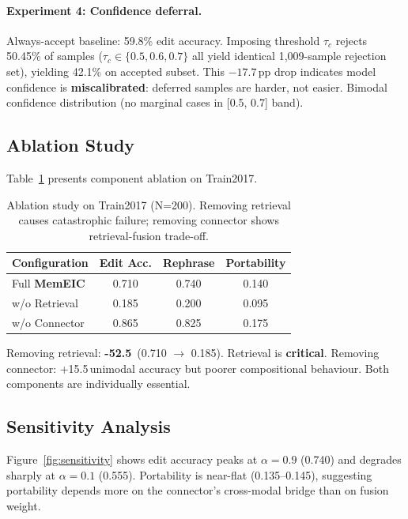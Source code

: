 \documentclass[11pt]{article}
\newcommand{\memeic}{\textbf{MemEIC}}
\newcommand{\pp}{\,\text{pp}}
\newcommand{\degrade}[1]{\textcolor{memred}{\textbf{#1}}}
\begin{document}
\paragraph{Experiment 4: Confidence deferral.}
Always-accept baseline: 59.8\% edit accuracy. Imposing threshold $\tau_c$
rejects 50.45\% of samples ($\tau_c \in \{0.5, 0.6, 0.7\}$ all yield identical
1{,}009-sample rejection set), yielding 42.1\% on accepted subset. This
$-17.7\pp$ drop indicates model confidence is \textbf{miscalibrated}: deferred
samples are harder, not easier. Bimodal confidence distribution (no marginal
cases in [0.5, 0.7] band).

\subsection{Ablation Study}
\label{sec:ablation}

Table~\ref{tab:ablation} presents component ablation on Train2017.

\begin{table}[t]
\centering
\caption{Ablation study on Train2017 (N=200). Removing retrieval causes
catastrophic failure; removing connector shows retrieval-fusion trade-off.}
\label{tab:ablation}
\small
\begin{tabular}{@{}lccc@{}}
\toprule
\textbf{Configuration} & \textbf{Edit Acc.} & \textbf{Rephrase} & \textbf{Portability} \\
\midrule
Full \memeic{}             & 0.710 & 0.740 & 0.140 \\
w/o Retrieval              & 0.185 & 0.200 & 0.095 \\
w/o Connector              & 0.865 & 0.825 & 0.175 \\
\bottomrule
\end{tabular}
\end{table}

Removing retrieval: \degrade{-52.5\pp} (0.710 $\to$ 0.185). Retrieval is
\textbf{critical}. Removing connector: +15.5\pp unimodal accuracy but poorer
compositional behaviour. Both components are individually essential.

\subsection{Sensitivity Analysis}
\label{sec:sensitivity}

Figure~\ref{fig:sensitivity} shows edit accuracy peaks at $\alpha=0.9$
(0.740) and degrades sharply at $\alpha=0.1$ (0.555). Portability is
near-flat (0.135--0.145), suggesting portability depends more on the
connector's cross-modal bridge than on fusion weight.
\end{document}
